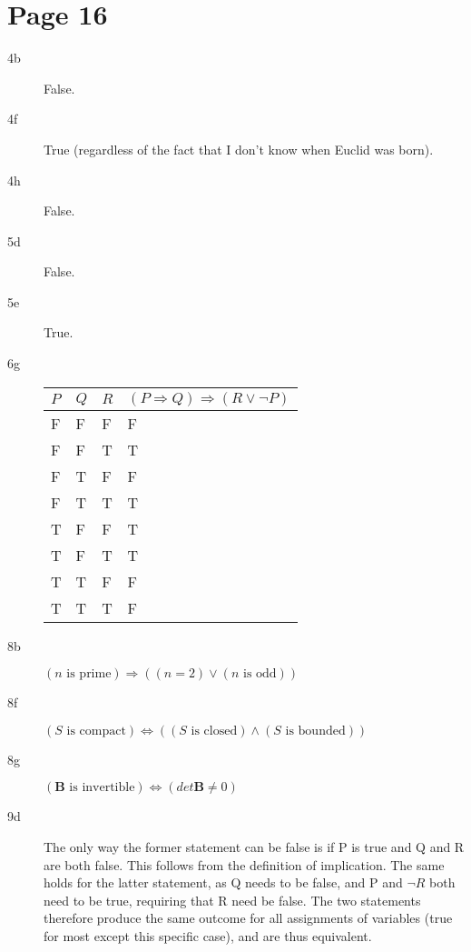 \documentclass[12pt]{article}
\begin{document}
\section*{Page 16}

\begin{description}

\item[4b] False.

\item[4f] True (regardless of the fact that I don't know when Euclid was born).

\item[4h] False.

\item[5d] False.

\item[5e] True.

\item[6g] 
  \begin{tabular}{lll|l}
    $P$ & $Q$ & $R$ & $(P \Rightarrow Q) \Rightarrow (R \vee \neg P)$ \\
    \hline
     F  &  F  &  F  &  F  \\
     F  &  F  &  T  &  T  \\
     F  &  T  &  F  &  F  \\
     F  &  T  &  T  &  T  \\
     T  &  F  &  F  &  T  \\
     T  &  F  &  T  &  T  \\
     T  &  T  &  F  &  F  \\
     T  &  T  &  T  &  F
  \end{tabular}

\item[8b] $(n \text{ is prime}) \Rightarrow ((n = 2) \vee (n \text{ is odd}))$

\item[8f] $(S \text{ is compact}) \Leftrightarrow 
           ((S \text{ is closed}) \wedge (S \text{ is bounded}))$

\item[8g] $(\mathbf{B} \text{ is invertible}) \Leftrightarrow
           (\mathit{det} \mathbf{B} \ne 0)$

\item[9d] The only way the former statement can be false is if P is true and
          Q and R are both false.  This follows from the definition of
          implication.  The same holds for the latter statement, as Q needs to
          be false, and P and $\neg R$ both need to be true, requiring that 
          R need be false.  The two statements therefore produce the same
          outcome for all assignments of variables (true for most except this 
          specific case), and are thus equivalent.


\end{description}
\end{document}
